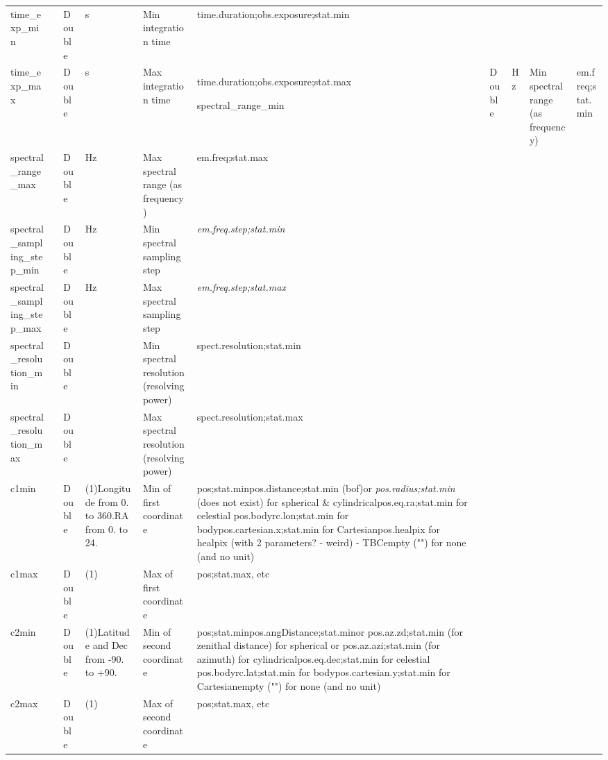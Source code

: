 \documentclass[11pt,a4paper]{ivoa}
\begin{document}
\begin{longtable}{p{3.5cm}p{0.5cm}p{1cm}p{1cm}p{7cm}p{3cm}}
time\_exp\_min&&Double&s&Min integration time&time.duration;obs.exposure;stat.min\\

time\_exp\_max&&Double&s&Max integration time&

time.duration;obs.exposure;stat.max


spectral\_range\_min&&Double&Hz&Min spectral range (as frequency)&em.freq;stat.min\\

spectral\_range\_max&&Double&Hz&Max spectral range (as frequency)&em.freq;stat.max\\

spectral\_sampling\_step\_min&&Double&Hz&Min spectral sampling step&\emph{em.freq.step;stat.min} \\

spectral\_sampling\_step\_max&&Double&Hz&Max spectral sampling step&\emph{em.freq.step;stat.max }\\

spectral\_resolution\_min&&Double&&Min spectral resolution (resolving power)&spect.resolution;stat.min\\

spectral\_resolution\_max&&Double&&Max spectral resolution (resolving power)&spect.resolution;stat.max\\

c1min&&Double&(1)Longitude from 0. to 360.RA from 0. to 24.&Min of first coordinate&pos;stat.minpos.distance;stat.min (bof)or \emph{pos.radius;stat.min} (does not exist)  for spherical \& cylindricalpos.eq.ra;stat.min for celestial pos.bodyrc.lon;stat.min for bodypos.cartesian.x;stat.min for Cartesianpos.healpix for healpix (with 2 parameters?  - weird) - TBCempty ("") for none (and no unit)\\

c1max&&Double&(1)&Max of first coordinate&pos;stat.max, etc\\

c2min&&Double&(1)Latitude and Dec from -90. to +90.&Min of second coordinate&pos;stat.minpos.angDistance;stat.minor pos.az.zd;stat.min (for zenithal distance) for spherical or pos.az.azi;stat.min (for azimuth)  for cylindricalpos.eq.dec;stat.min for celestial pos.bodyrc.lat;stat.min for bodypos.cartesian.y;stat.min for Cartesianempty ("") for none (and no unit)\\

c2max&&Double&(1)&Max of second coordinate&pos;stat.max, etc\\


\end{longtable}
\end{document}
